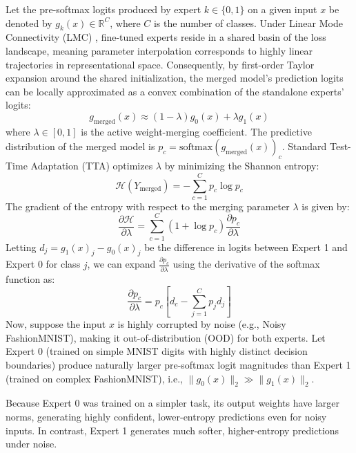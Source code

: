 \documentclass{article}
\theoremstyle{plain}
\theoremstyle{definition}
\theoremstyle{remark}
\begin{document}
Let the pre-softmax logits produced by expert $k \in \{0, 1\}$ on a given input $x$ be denoted by $g_k(x) \in \mathbb{R}^C$, where $C$ is the number of classes. Under Linear Mode Connectivity (LMC) \cite{wortsman22, ainsworth23}, fine-tuned experts reside in a shared basin of the loss landscape, meaning parameter interpolation corresponds to highly linear trajectories in representational space. Consequently, by first-order Taylor expansion around the shared initialization, the merged model's prediction logits can be locally approximated as a convex combination of the standalone experts' logits:
\begin{equation}
    g_{\text{merged}}(x) \approx (1 - \lambda) g_0(x) + \lambda g_1(x)
\end{equation}
where $\lambda \in [0, 1]$ is the active weight-merging coefficient. The predictive distribution of the merged model is $p_c = \text{softmax}(g_{\text{merged}}(x))_c$. Standard Test-Time Adaptation (TTA) optimizes $\lambda$ by minimizing the Shannon entropy:
\begin{equation}
    \mathcal{H}(Y_{\text{merged}}) = - \sum_{c=1}^C p_c \log p_c
\end{equation}
The gradient of the entropy with respect to the merging parameter $\lambda$ is given by:
\begin{equation}
    \frac{\partial \mathcal{H}}{\partial \lambda} = \sum_{c=1}^C (1 + \log p_c) \frac{\partial p_c}{\partial \lambda}
\end{equation}
Letting $d_j = g_1(x)_j - g_0(x)_j$ be the difference in logits between Expert 1 and Expert 0 for class $j$, we can expand $\frac{\partial p_c}{\partial \lambda}$ using the derivative of the softmax function as:
\begin{equation}
    \frac{\partial p_c}{\partial \lambda} = p_c \left[ d_c - \sum_{j=1}^C p_j d_j \right]
\end{equation}
Now, suppose the input $x$ is highly corrupted by noise (e.g., Noisy FashionMNIST), making it out-of-distribution (OOD) for both experts. Let Expert 0 (trained on simple MNIST digits with highly distinct decision boundaries) produce naturally larger pre-softmax logit magnitudes than Expert 1 (trained on complex FashionMNIST), i.e., $\|g_0(x)\|_2 \gg \|g_1(x)\|_2$. 

Because Expert 0 was trained on a simpler task, its output weights have larger norms, generating highly confident, lower-entropy predictions even for noisy inputs. In contrast, Expert 1 generates much softer, higher-entropy predictions under noise. 
\end{document}
